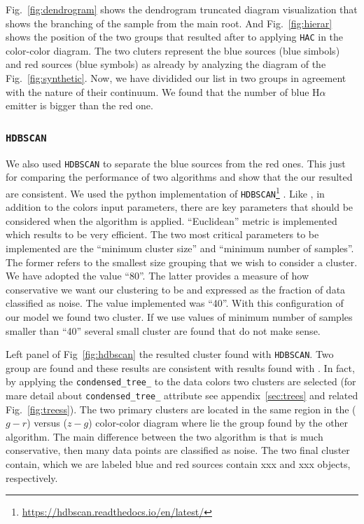 \documentclass[fleqn,usenatbib]{mnras}
\begin{document}
Fig.~\ref{fig:dendrogram} shows the dendrogram truncated diagram visualization that
shows the branching of the sample from the main root. And Fig.~\ref{fig:hierar} shows
the position of the two groups that resulted after to applying \texttt{HAC} in the
color-color diagram. The two cluters represent the blue sources (blue simbols)
and red sources (blue symbols) as already by analyzing the diagram of the
Fig.~\ref{fig:synthetic}. Now, we have dividided our list in two groups in agreement
with the nature of their continuum. We found that the number of blue H{$\alpha$}
emitter is bigger than the red one.

\subsubsection{\texttt{HDBSCAN}}

We also used \texttt{HDBSCAN} to separate the blue sources from the red ones. This just for
comparing the performance of two algorithms and show that the our resulted are consistent.
We used the python implementation of \texttt{HDBSCAN}\footnote{\url{https://hdbscan.readthedocs.io/en/latest/}}
\citep{McInnes:2017}. Like , in addition to the colors input
parameters,  there are key parameters that should be considered  when the algorithm is
applied. ``Euclidean'' metric is implemented which results to be very efficient. The two most
critical parameters to be implemented are the ``minimum cluster size'' and ``minimum number
of samples''. The former refers to the smallest size grouping that we wish to consider a cluster.
We have adopted the value ``80''. The latter provides a measure of how conservative we want our
clustering to be and expressed as the fraction of data classified as noise.
The value implemented was ``40''. With this configuration of our model we found
two cluster. If we use values of minimum number of samples smaller than ``40'' several small
cluster are found that do not make sense.

Left panel of Fig~\ref{fig:hdbscan} the resulted cluster found with \texttt{HDBSCAN}. Two group are
found and these results are consistent with results found with  .
In fact, by applying the
\texttt{condensed\_tree\_} to the data colors two clusters are selected (for mare detail about
\texttt{condensed\_tree\_} attribute see appendix~\ref{sec:trees} and related
Fig.~\ref{fig:treess}). The two primary clusters are located in the same region in
the ($g - r$) versus ($z - g$) color-color diagram where lie the group found by the other algorithm.
The main difference between the two algorithm is that  
is much conservative, then many data points are classified as noise. The two final cluster
contain, which we are labeled blue and red sources contain xxx and xxx objects, respectively.
\end{document}
